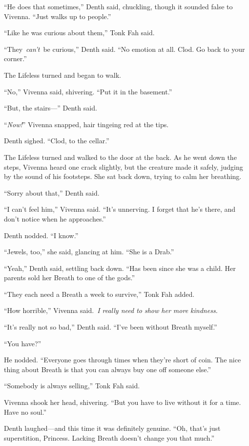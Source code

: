 “He does that sometimes,” Denth said, chuckling, though it sounded false to Vivenna. “Just walks up to people.”

“Like he was curious about them,” Tonk Fah said.

“They~\textit{can’t}~be curious,” Denth said. “No emotion at all. Clod. Go back to your corner.”

The Lifeless turned and began to walk.

“No,” Vivenna said, shivering. “Put it in the basement.”

“But, the stairs—” Denth said.

“\textit{Now!}” Vivenna snapped, hair tingeing red at the tips.

Denth sighed. “Clod, to the cellar.”

The Lifeless turned and walked to the door at the back. As he went down the steps, Vivenna heard one crack slightly, but the creature made it safely, judging by the sound of his footsteps. She sat back down, trying to calm her breathing.

“Sorry about that,” Denth said.

“I can’t feel him,” Vivenna said. “It’s unnerving. I forget that he’s there, and don’t notice when he approaches.”

Denth nodded. “I know.”

“Jewels, too,” she said, glancing at him. “She is a Drab.”

“Yeah,” Denth said, settling back down. “Has been since she was a child. Her parents sold her Breath to one of the gods.”

“They each need a Breath a week to survive,” Tonk Fah added.

“How horrible,” Vivenna said.~\textit{I really need to show her more kindness.}

“It’s really not so bad,” Denth said. “I’ve been without Breath myself.”

“You have?”

He nodded. “Everyone goes through times when they’re short of coin. The nice thing about Breath is that you can always buy one off someone else.”

“Somebody is always selling,” Tonk Fah said.

Vivenna shook her head, shivering. “But you have to live without it for a time. Have no soul.”

Denth laughed—and this time it was definitely genuine. “Oh, that’s just superstition, Princess. Lacking Breath doesn’t change you that much.”

